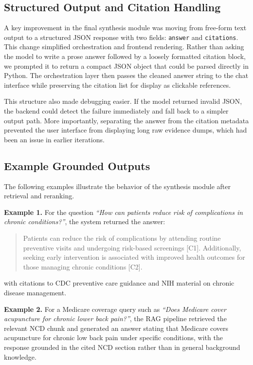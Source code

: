 \documentclass[10pt, letterpaper]{article}
\begin{document}
\subsection{Structured Output and Citation Handling}

A key improvement in the final synthesis module was moving from free-form text output to a
structured JSON response with two fields: \texttt{answer} and \texttt{citations}. This
change simplified orchestration and frontend rendering. Rather than asking the model to
write a prose answer followed by a loosely formatted citation block, we prompted it to
return a compact JSON object that could be parsed directly in Python. The orchestration
layer then passes the cleaned answer string to the chat interface while preserving the
citation list for display as clickable references.

This structure also made debugging easier. If the model returned invalid JSON, the backend
could detect the failure immediately and fall back to a simpler output path. More
importantly, separating the answer from the citation metadata prevented the user interface
from displaying long raw evidence dumps, which had been an issue in earlier iterations.

\subsection{Example Grounded Outputs}

The following examples illustrate the behavior of the synthesis module after retrieval and
reranking.

\textbf{Example 1.} For the question \textit{``How can patients reduce risk of
complications in chronic conditions?''}, the system returned the answer:

\begin{quote}
Patients can reduce the risk of complications by attending routine preventive visits and
undergoing risk-based screenings [C1]. Additionally, seeking early intervention is
associated with improved health outcomes for those managing chronic conditions [C2].
\end{quote}

with citations to CDC preventive care guidance and NIH material on chronic disease
management.

\textbf{Example 2.} For a Medicare coverage query such as \textit{``Does Medicare cover
acupuncture for chronic lower back pain?''}, the RAG pipeline retrieved the relevant NCD
chunk and generated an answer stating that Medicare covers acupuncture for chronic low back
pain under specific conditions, with the response grounded in the cited NCD section rather
than in general background knowledge.
\end{document}
